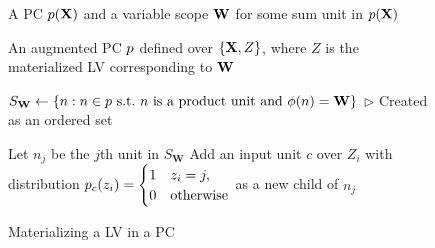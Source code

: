 \documentclass{article} %
\newcommand{\guy}[1]{\textcolor{blue}{\textbf{[Guy: #1]}}}
\begin{document}
\begin{figure}[t]
\begin{algorithm}[H]
\caption{Materializing a LV in a PC 
}
\label{alg:lv}
{\fontsize{9}{9} \selectfont
\begin{algorithmic}[1]

 A PC ${p}(\mathbf{X})$ and a variable scope $\mathbf{W}$ for some sum unit in ${p}(\mathbf{X})$

 An augmented PC ${p}$ defined over $\{\mathbf{X}, Z\}$, where $Z$ is the materialized LV corresponding to $\mathbf{W}$

\STATE $S_{\mathbf{W}} \leftarrow \{n : n \in {p} \text{~s.t.~} n \text{~is~a~product~unit~and~} {\phi}(n) = \mathbf{W} \}$ \hfill \textcolor[RGB]{115,119,123}{$\triangleright$ Created as an ordered set}

\STATE Let $n_j$ be the $j$th unit in $S_{\mathbf{W}}$
\STATE Add an input unit $c$ over $Z_i$ with distribution ${p}_c(z_i) = \begin{cases} 1 & z_i = j, \\ 0 & \text{otherwise} \end{cases}$ as a new child of $n_j$

\ENDFOR

\end{algorithmic}
}
\end{algorithm}
\vspace{-3em}
\end{figure}
\end{document}
